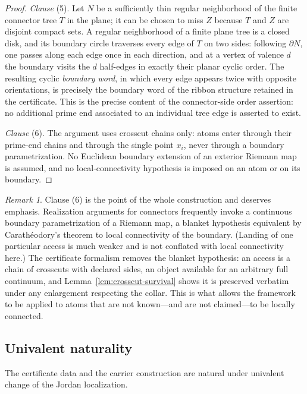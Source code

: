 \documentclass[11pt,reqno]{amsart}
\theoremstyle{definition}
\theoremstyle{remark}
\newtheorem{remark}[theorem]{Remark}
\begin{document}
\begin{proof}
\emph{Clause} (5).  Let $N$ be a sufficiently thin regular neighborhood of
the finite connector tree $T$ in the plane; it can be chosen to miss $Z$
because $T$ and $Z$ are disjoint compact sets.  A regular neighborhood of a finite plane tree is a closed
disk, and its boundary circle traverses every edge of $T$ on two sides:
following $\partial N$, one passes along each edge once in each
direction, and at a vertex of valence $d$ the boundary visits the $d$
half-edges in exactly their planar cyclic order.  The resulting cyclic
\emph{boundary word}, in which every edge appears twice with opposite
orientations, is precisely the boundary word of the ribbon structure
retained in the certificate.  This is the precise content of the
connector-side order assertion: no additional prime end associated to an
individual tree edge is asserted to exist.

\emph{Clause} (6).  The argument uses crosscut chains only: atoms enter
through their prime-end chains and through the single point $x_i$, never
through a boundary parametrization.  No Euclidean boundary extension of
an exterior Riemann map is assumed, and no local-connectivity hypothesis
is imposed on an atom or on its boundary.
\end{proof}

\begin{remark}\label{rem:C-no-lc}
Clause (6) is the point of the whole construction and deserves emphasis.
Realization arguments for connectors frequently invoke a continuous
boundary parametrization of a Riemann map, a blanket hypothesis equivalent
by Carath\'eodory's theorem to local connectivity of the boundary.
(Landing of one particular access is much weaker and is not conflated with
local connectivity here.)  The certificate formalism removes the blanket
hypothesis: an access is a chain of crosscuts with declared sides,
an object available for an arbitrary full continuum, and
Lemma~\ref{lem:crosscut-survival} shows it is preserved verbatim under
any enlargement respecting the collar.  This is what allows the framework
to be applied to atoms that are not
known---and are not claimed---to be locally connected.
\end{remark}

\subsection*{Univalent naturality}
The certificate data and the carrier construction are natural under
univalent change of the Jordan localization.
\end{document}
